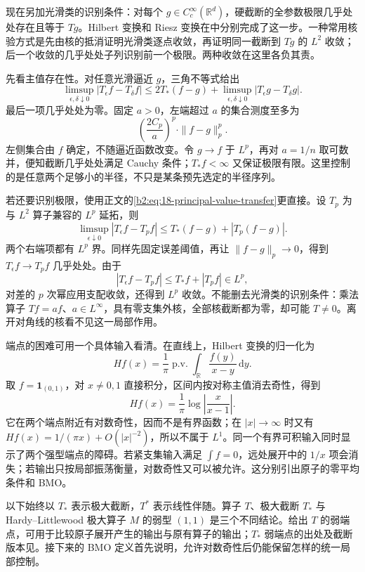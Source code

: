 \ProseParagraphBreak

现在另加光滑类的识别条件：对每个 \(g\in C_c^\infty(\mathbb R^d)\)，硬截断的全参数极限几乎处处存在且等于 \(Tg\)。Hilbert 变换和 Riesz 变换在中分别完成了这一步。一种常用核验方式是先由核的抵消证明光滑类逐点收敛，再证明同一截断到 \(Tg\) 的 \(L^2\) 收敛；后一个收敛的几乎处处子列识别前一个极限。两种收敛在这里各负其责。

\ProseParagraphBreak

先看主值存在性。对任意光滑逼近 \(g\)，三角不等式给出
\[
 \limsup_{\epsilon,\delta\downarrow0}|T_\epsilon f-T_\delta f|
 \leq 2T_*(f-g)+
       \limsup_{\epsilon,\delta\downarrow0}|T_\epsilon g-T_\delta g|.
\]
最后一项几乎处处为零。固定 \(a>0\)，左端超过 \(a\) 的集合测度至多为
\[
 \left(\frac{2C_p}{a}\right)^p\cdot\|f-g\|_p^p.
\]
左侧集合由 \(f\) 确定，不随逼近函数改变。令 \(g\to f\) 于 \(L^p\)，再对 \(a=1/n\) 取可数并，便知截断几乎处处满足 Cauchy 条件；\(T_*f<\infty\) 又保证极限有限。这里控制的是任意两个足够小的半径，不只是某条预先选定的半径序列。

\ProseParagraphBreak

若还要识别极限，使用正文的\eqref{b2:eq:18-principal-value-transfer}更直接。设 \(T_p\) 为与 \(L^2\) 算子兼容的 \(L^p\) 延拓，则
\[
 \limsup_{\epsilon\downarrow0}|T_\epsilon f-T_pf|
 \leq T_*(f-g)+|T_p(f-g)|.
\]
两个右端项都有 \(L^p\) 界。同样先固定误差阈值，再让 \(\|f-g\|_p\to0\)，得到 \(T_\epsilon f\to T_pf\) 几乎处处。由于
\[
 |T_\epsilon f-T_pf|\leq T_*f+|T_pf|\in L^p,
\]
对差的 \(p\) 次幂应用支配收敛，还得到 \(L^p\) 收敛。不能删去光滑类的识别条件：乘法算子 \(Tf=a f\)、\(a\in L^\infty\)，具有零支集外核，全部核截断都为零，却可能 \(T\ne0\)。离开对角线的核看不见这一局部作用。

\ProseParagraphBreak

端点的困难可用一个具体输入看清。在直线上，Hilbert 变换的归一化为
\[
 Hf(x)=\frac1\pi\operatorname{p.v.}\int_{\mathbb R}\frac{f(y)}{x-y}\,\mathrm dy.
\]
取 \(f=\mathbf1_{(0,1)}\)，对 \(x\ne0,1\) 直接积分，区间内按对称主值消去奇性，得到
\[
 Hf(x)=\frac1\pi\log\left|\frac{x}{x-1}\right|.
\]
它在两个端点附近有对数奇性，因而不是有界函数；在 \(|x|\to\infty\) 时又有 \(Hf(x)=1/(\pi x)+O(|x|^{-2})\)，所以不属于 \(L^1\)。同一个有界可积输入同时显示了两个强型端点的障碍。若紧支集输入满足 \(\int f=0\)，远处展开中的 \(1/x\) 项会消失；若输出只按局部振荡衡量，对数奇性又可以被允许。这分别引出原子的零平均条件和 BMO。

\ProseParagraphBreak

以下始终以 \(T_*\) 表示极大截断，\(T^*\) 表示线性伴随。算子 \(T\)、极大截断 \(T_*\) 与 Hardy--Littlewood 极大算子 \(M\) 的弱型 \((1,1)\) 是三个不同结论。给出 \(T\) 的弱端点，可用于比较原子展开产生的输出与原有算子的输出；\(T_*\) 弱端点的出处及截断版本见。接下来的 BMO 定义首先说明，允许对数奇性后仍能保留怎样的统一局部控制。



